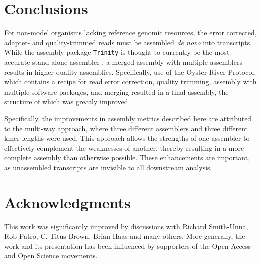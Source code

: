 \documentclass[10pt,letterpaper]{article}
\begin{document}
\section{Conclusions}

For non-model organisms lacking reference genomic resources, the error corrected, adapter- and quality-trimmed reads must be assembled \textit{de novo} into transcripts. While the assembly package \texttt{Trinity} \citep{Haas:2013jq} is thought to currently be the most accurate stand-alone assembler \citep{Li:2014cm}, a merged assembly with multiple assemblers results in higher quality assemblies. Specifically, use of the Oyster River Protocol, which contains a recipe for read error correction, quality trimming, assembly with multiple software packages, and merging resulted in a final assembly, the structure of which was greatly improved. 

Specifically, the improvements in assembly metrics described here are attributed to the multi-way approach, where three different assemblers and three different kmer lengths were used. This approach allows the strengths of one assembler to effectively complement the weaknesses of another, thereby resulting in a more complete assembly than otherwise possible. These enhancements are important, as unassembled transcripts are invisible to all downstream analysis.      

\section*{Acknowledgments}

This work was significantly improved by discussions with Richard Smith-Unna, Rob Patro, C. Titus Brown, Brian Haas and many others. More generally, the work and its presentation has been influenced by supporters of the Open Access and Open Science movements. 


\printbibliography
\end{document}
